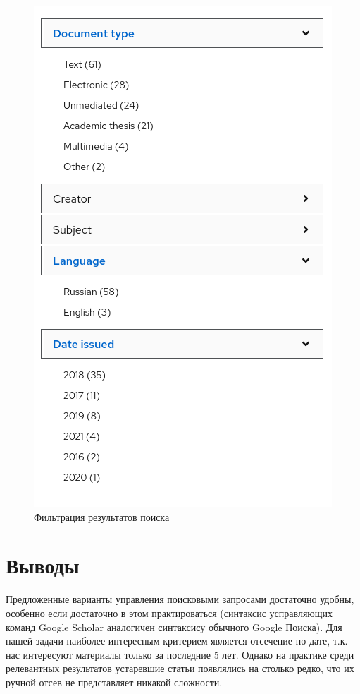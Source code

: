 \documentclass[a4paper, 12pt]{report}		%
\begin{document}
\begin{figure}[H]
 \centering
 \includegraphics[scale=0.8]{res/src3}
 \caption{Фильтрация результатов поиска}
\end{figure}

\section*{Выводы}

Предложенные варианты управления поисковыми запросами достаточно удобны, особенно если достаточно в этом практироваться (синтаксис усправляющих команд Google Scholar аналогичен синтаксису обычного Google Поиска). Для нашей задачи наиболее интересным критерием является отсечение по дате, т.к. нас интересуют материалы только за последние 5 лет. Однако на практике среди релевантных результатов устаревшие статьи появлялись на столько редко, что их ручной отсев не представляет никакой сложности.
\end{document}
